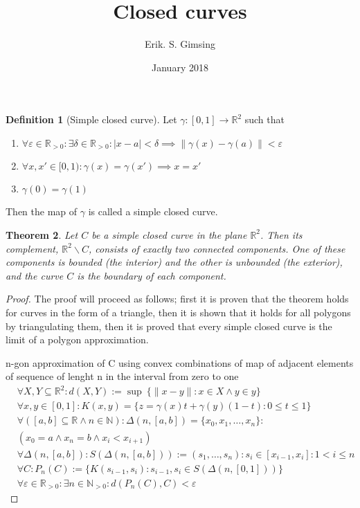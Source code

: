 \documentclass[a4paper,11pt]{article}
\title{Closed curves}
\author{Erik. S. Gimsing}
\date{January 2018}
\theoremstyle{plain}
\newtheorem{theorem}{Theorem}
\theoremstyle{definition}
\newtheorem{definition}[theorem]{Definition}
\newcommand{\R}{\mathbb{R}}
\newcommand{\N}{\mathbb{N}}
\begin{document}
\maketitle
\begin{definition}[Simple closed curve]
	Let $\gamma : [0,1] \rightarrow \R^2$ such that
	\begin{enumerate}
		\item $\forall \varepsilon \in \R_{>0}: \exists \delta \in
			\R_{>0}: |x-a| < \delta \implies 
			\|\gamma(x)-\gamma(a)\|<\varepsilon$
		\item $\forall x,x' \in [0,1): \gamma(x) = \gamma(x') 
			\implies x = x'$
		\item $\gamma(0) = \gamma(1)$
	\end{enumerate}
	Then the map of $\gamma$ is called a simple closed curve.
\end{definition}
\begin{theorem}
	Let $C$ be a simple closed curve in the plane $\R^2$. Then its
	complement, $\R^2\backslash C$, consists of exactly two connected
	components. One of these components is bounded (the interior)
	and the other is unbounded (the exterior), and the curve $C$
	is the boundary of each component.
\end{theorem}
\begin{proof}
	The proof will proceed as follows; first it is proven that the
	theorem holds for curves in the form of a triangle, then it
	is shown that it holds for all polygons by triangulating them,
	then it is proved that every simple closed curve is the limit
	of a polygon approximation.
	
	n-gon approximation of C using convex combinations of map of
	adjacent elements of sequence of lenght n in the
	interval from zero to one
	\begin{equation}
	\begin{aligned}
		&\forall X,Y \subseteq \R^2: d(X,Y) := \sup\ \{\|x-y\|:x\in X \land y 
		\in y\} \\
		&\forall x,y \in [0,1]: K(x,y) = \{z=\gamma(x)t+\gamma(y)(1-t)
		:0\leq t \leq 1\} \\
		&\forall ([a,b] \subseteq \R \land n \in \N): 
		\Delta(n,[a,b]) = \{x_0,x_1,\dots,x_n\}:\\ 
		&(x_0=a \land x_n = b \land x_i<x_{i+1}) \\
		&\forall \Delta(n,[a,b]): S(\Delta(n,[a,b])) := (s_1,\dots,s_n):
		s_i\in [x_{i-1},x_i]: 1<i\leq n\\
		&\forall C: P_n(C) := \{K(s_{i-1},s_i):s_{i-1},s_i\in 
		S(\Delta(n,[0,1]))\}\\
		&\forall \varepsilon \in \R_{>0}: \exists n \in \N_{>0} : d(P_n(C),C)<
		\varepsilon
	\end{aligned}
	\end{equation}
\end{proof}
\end{document}

